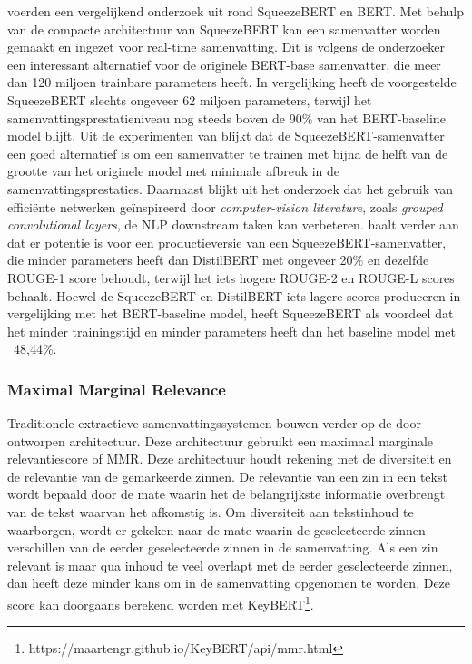 \textcite{AbdelSalam2022} voerden een vergelijkend onderzoek uit rond SqueezeBERT en BERT. Met behulp van de compacte architectuur van SqueezeBERT kan een samenvatter worden gemaakt en ingezet voor real-time samenvatting. Dit is volgens de onderzoeker een interessant alternatief voor de originele BERT-base samenvatter, die meer dan 120 miljoen trainbare parameters heeft. In vergelijking heeft de voorgestelde SqueezeBERT slechts ongeveer 62 miljoen parameters, terwijl het samenvattingsprestatieniveau nog steeds boven de 90\% van het BERT-baseline model blijft. Uit de experimenten van \textcite{AbdelSalam2022} blijkt dat de SqueezeBERT-samenvatter een goed alternatief is om een samenvatter te trainen met bijna de helft van de grootte van het originele model met minimale afbreuk in de samenvattingsprestaties. Daarnaast blijkt uit het onderzoek dat het gebruik van efficiënte netwerken geïnspireerd door \textit{computer-vision literature}, zoals \textit{grouped convolutional layers}, de NLP downstream taken kan verbeteren.  \textcite{AbdelSalam2022} haalt verder aan dat er potentie is voor een productieversie van een SqueezeBERT-samenvatter, die minder parameters heeft dan DistilBERT met ongeveer 20\% en dezelfde ROUGE-1 score behoudt, terwijl het iets hogere ROUGE-2 en ROUGE-L scores behaalt. Hoewel de SqueezeBERT en DistilBERT iets lagere scores produceren in vergelijking met het BERT-baseline model, heeft SqueezeBERT als voordeel dat het minder trainingstijd en minder parameters heeft dan het baseline model met ~48,44\%. 

\subsubsection{Maximal Marginal Relevance}

Traditionele extractieve samenvattingssystemen bouwen verder op de door \textcite{Carbonell1998} ontworpen architectuur. Deze architectuur gebruikt een maximaal marginale relevantiescore of MMR. Deze architectuur houdt rekening met de diversiteit en de relevantie van de gemarkeerde zinnen. De relevantie van een zin in een tekst wordt bepaald door de mate waarin het de belangrijkste informatie overbrengt van de tekst waarvan het afkomstig is. Om diversiteit aan tekstinhoud te waarborgen, wordt er gekeken naar de mate waarin de geselecteerde zinnen verschillen van de eerder geselecteerde zinnen in de samenvatting. Als een zin relevant is maar qua inhoud te veel overlapt met de eerder geselecteerde zinnen, dan heeft deze minder kans om in de samenvatting opgenomen te worden. Deze score kan doorgaans berekend worden met KeyBERT\footnote{https://maartengr.github.io/KeyBERT/api/mmr.html}.

